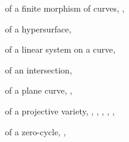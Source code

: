 {{\noindent\hspace*{7.5bp}of a finite morphism of curves, , \par
\noindent\hspace*{7.5bp}of a hypersurface, \par
\noindent\hspace*{7.5bp}of a linear system on a curve, \par
\noindent\hspace*{7.5bp}of an intersection, \par
\noindent\hspace*{7.5bp}of a plane curve, , \par
\noindent\hspace*{7.5bp}of a projective variety, , , , , ,\par
\noindent\hspace*{15.0bp}\par
\noindent\hspace*{7.5bp}of a zero-cycle, , \par
}
}
